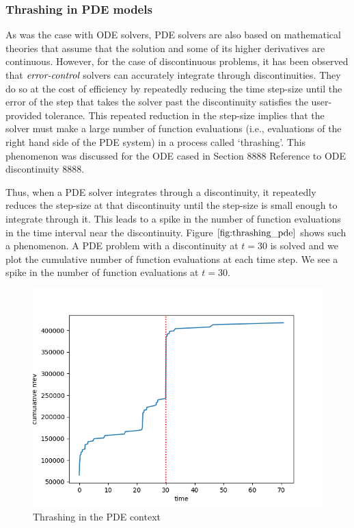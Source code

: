 \documentclass{article}
\begin{document}
\subsubsection{Thrashing in PDE models}
\label{subsection:pde_thrashing}
As was the case with ODE solvers, PDE solvers are also based on mathematical theories that assume that the solution and some of its higher derivatives are continuous. However, for the case of discontinuous problems, it has been observed that $\emph{error-control}$ solvers can accurately integrate through discontinuities. They do so at the cost of efficiency by repeatedly reducing the time step-size until the error of the step that takes the solver past the discontinuity satisfies the user-provided tolerance. This repeated reduction in the step-size implies that the solver must make a large number of function evaluations (i.e., evaluations of the right hand side of the PDE system) in a process called `thrashing'. This phenomenon was discussed for the ODE cased in Section 8888 Reference to ODE discontinuity 8888.

Thus, when a PDE solver integrates through a discontinuity, it repeatedly reduces the step-size at that discontinuity until the step-size is small enough to integrate through it. This leads to a spike in the number of function evaluations in the time interval near the discontinuity. Figure $\ref{fig:thrashing_pde}$ shows such a phenomenon. A PDE problem with a discontinuity at $t=30$ is solved and we plot the cumulative number of function evaluations at each time step. We see a spike in the number of function evaluations at $t=30$.
\begin{figure}[H]
\centering
\includegraphics[width=0.7\linewidth]{./figures/pde_thrashing}
\caption{Thrashing in the PDE context}
\label{fig:thrashing_pde}
\end{figure}
\end{document}
